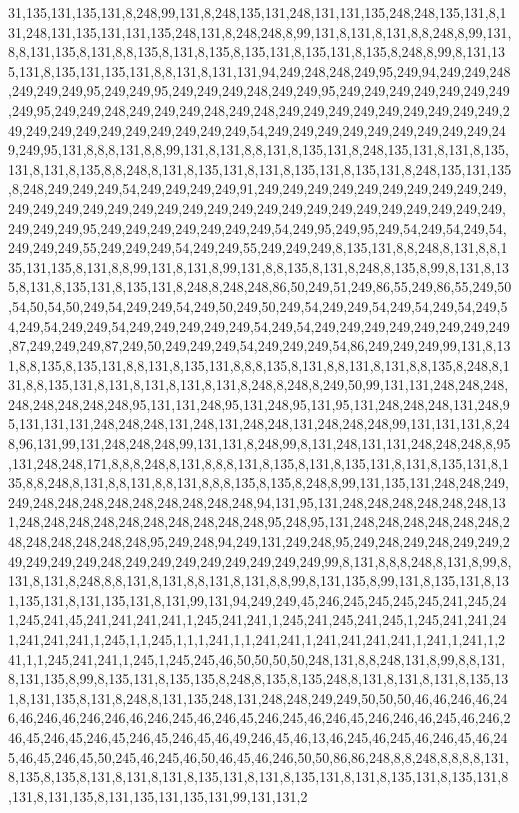 31,135,131,135,131,8,248,99,131,8,248,135,131,248,131,131,135,248,248,135,131,8,131,248,131,135,131,131,135,248,131,8,248,248,8,99,131,8,131,8,131,8,8,248,8,99,131,8,8,131,135,8,131,8,8,135,8,131,8,135,8,135,131,8,135,131,8,135,8,248,8,99,8,131,135,131,8,135,131,135,131,8,8,131,8,131,131,94,249,248,248,249,95,249,94,249,249,248,249,249,249,95,249,249,95,249,249,249,248,249,249,95,249,249,249,249,249,249,249,249,95,249,249,248,249,249,249,248,249,248,249,249,249,249,249,249,249,249,249,249,249,249,249,249,249,249,249,249,249,54,249,249,249,249,249,249,249,249,249,249,249,95,131,8,8,8,131,8,8,99,131,8,131,8,8,131,8,135,131,8,248,135,131,8,131,8,135,131,8,131,8,135,8,8,248,8,131,8,135,131,8,131,8,135,131,8,135,131,8,248,135,131,135,8,248,249,249,249,54,249,249,249,249,91,249,249,249,249,249,249,249,249,249,249,249,249,249,249,249,249,249,249,249,249,249,249,249,249,249,249,249,249,249,249,249,249,249,95,249,249,249,249,249,249,249,54,249,95,249,95,249,54,249,54,249,54,249,249,249,55,249,249,249,54,249,249,55,249,249,249,8,135,131,8,8,248,8,131,8,8,135,131,135,8,131,8,8,99,131,8,131,8,99,131,8,8,135,8,131,8,248,8,135,8,99,8,131,8,135,8,131,8,135,131,8,135,131,8,248,8,248,248,86,50,249,51,249,86,55,249,86,55,249,50,54,50,54,50,249,54,249,249,54,249,50,249,50,249,54,249,249,54,249,54,249,54,249,54,249,54,249,249,54,249,249,249,249,249,54,249,54,249,249,249,249,249,249,249,249,87,249,249,249,87,249,50,249,249,249,54,249,249,249,54,86,249,249,249,99,131,8,131,8,8,135,8,135,131,8,8,131,8,135,131,8,8,8,135,8,131,8,8,131,8,131,8,8,135,8,248,8,131,8,8,135,131,8,131,8,131,8,131,8,131,8,248,8,248,8,249,50,99,131,131,248,248,248,248,248,248,248,248,95,131,131,248,95,131,248,95,131,95,131,248,248,248,131,248,95,131,131,131,248,248,248,131,248,131,248,248,131,248,248,248,99,131,131,131,8,248,96,131,99,131,248,248,248,99,131,131,8,248,99,8,131,248,131,131,248,248,248,8,95,131,248,248,171,8,8,8,248,8,131,8,8,8,131,8,135,8,131,8,135,131,8,131,8,135,131,8,135,8,8,248,8,131,8,8,131,8,8,131,8,8,8,135,8,135,8,248,8,99,131,135,131,248,248,249,249,248,248,248,248,248,248,248,248,248,94,131,95,131,248,248,248,248,248,248,131,248,248,248,248,248,248,248,248,248,248,95,248,95,131,248,248,248,248,248,248,248,248,248,248,248,248,95,249,248,94,249,131,249,248,95,249,248,249,248,249,249,249,249,249,249,248,249,249,249,249,249,249,249,249,99,8,131,8,8,8,248,8,131,8,99,8,131,8,131,8,248,8,8,131,8,131,8,8,131,8,131,8,8,99,8,131,135,8,99,131,8,135,131,8,131,135,131,8,131,135,131,8,131,99,131,94,249,249,45,246,245,245,245,245,241,245,241,245,241,45,241,241,241,241,1,245,241,241,1,245,241,245,241,245,1,245,241,241,241,241,241,241,1,245,1,1,245,1,1,1,241,1,1,241,241,1,241,241,241,241,1,241,1,241,1,241,1,1,245,241,241,1,245,1,245,245,46,50,50,50,50,248,131,8,8,248,131,8,99,8,8,131,8,131,135,8,99,8,135,131,8,135,135,8,248,8,135,8,135,248,8,131,8,131,8,131,8,135,131,8,131,135,8,131,8,248,8,131,135,248,131,248,248,249,249,50,50,50,46,46,246,46,246,46,246,46,246,246,46,246,245,46,246,45,246,245,46,246,45,246,246,46,245,46,246,246,45,246,45,246,45,246,45,246,45,46,49,246,45,46,13,46,245,46,245,46,246,45,46,245,46,45,246,45,50,245,46,245,46,50,46,45,46,246,50,50,86,86,248,8,8,248,8,8,8,8,131,8,135,8,135,8,131,8,131,8,131,8,135,131,8,131,8,135,131,8,131,8,135,131,8,135,131,8,131,8,131,135,8,131,135,131,135,131,99,131,131,2